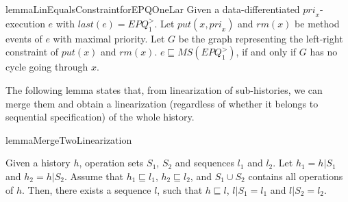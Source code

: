 \begin{restatable}{lemma}{LinEqualsConstraintforEPQOneLar}
\label{lemma:Lin Equals Constraint for EPQ1Lar}
Given a data-differentiated $\textit{pri}_x$-execution $e$ with $\textit{last}(e) = \textit{EPQ}_1^{>}$. Let $\textit{put}(x,\textit{pri}_x)$ and $\textit{rm}(x)$ be method events of $e$ with maximal priority. Let $G$ be the graph representing the left-right constraint of $\textit{put}(x)$ and $\textit{rm}(x)$. $e \sqsubseteq \textit{MS}(\textit{EPQ}_1^{>})$, if and only if $G$ has no cycle going through $x$.
\end{restatable}


The following lemma states that, from linearization of sub-histories, we can merge them and obtain a linearization (regardless of whether it belongs to sequential specification) of the whole history.

\begin{restatable}{lemma}{MergeTwoLinearization}
\label{lemma:merge two linearization}

Given a history $h$, operation sets $S_1$, $S_2$ and sequences $l_1$ and $l_2$. Let $h_1 = h \vert{S_1}$ and $h_2 = h \vert{S_2}$. Assume that $h_1 \sqsubseteq l_1$, $h_2 \sqsubseteq l_2$, and $S_1 \cup S_2$ contains all operations of $h$. Then, there exists a sequence $l$, such that $h \sqsubseteq l$, $l \vert{S_1} = l_1$ and $l \vert{S_2} = l_2$.
\end{restatable}

